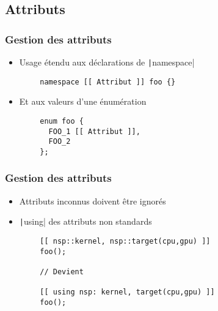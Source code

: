 \documentclass[C++.tex]{subfiles}
\begin{document}
\subsection*{Attributs}
\begin{frame}[fragile]
	\frametitle{Gestion des attributs}
	\begin{itemize}
		\item Usage étendu aux déclarations de \texttt|namespace|
	\end{itemize}

	\begin{verbatim}
		namespace [[ Attribut ]] foo {}
	\end{verbatim}

	\begin{itemize}
		\item Et aux valeurs d'une énumération
	\end{itemize}

	\begin{verbatim}
		enum foo {
		  FOO_1 [[ Attribut ]],
		  FOO_2
		};
	\end{verbatim}

\end{frame}

\begin{frame}[fragile]
	\frametitle{Gestion des attributs}
	\begin{itemize}
		\item Attributs inconnus doivent être ignorés


		\item \texttt|using| des attributs non standards
	\end{itemize}

	\begin{verbatim}
		[[ nsp::kernel, nsp::target(cpu,gpu) ]]
		foo();

		// Devient

		[[ using nsp: kernel, target(cpu,gpu) ]]
		foo();
	\end{verbatim}

\end{frame}
\end{document}
